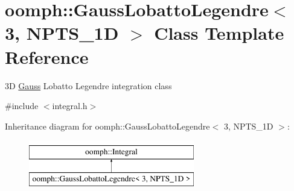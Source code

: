 \hypertarget{classoomph_1_1GaussLobattoLegendre_3_013_00_01NPTS__1D_01_4}{}\section{oomph\+:\+:Gauss\+Lobatto\+Legendre$<$ 3, N\+P\+T\+S\+\_\+1D $>$ Class Template Reference}
\label{classoomph_1_1GaussLobattoLegendre_3_013_00_01NPTS__1D_01_4}


3D \hyperlink{classoomph_1_1Gauss}{Gauss} Lobatto Legendre integration class  




{\ttfamily \#include $<$integral.\+h$>$}

Inheritance diagram for oomph\+:\+:Gauss\+Lobatto\+Legendre$<$ 3, N\+P\+T\+S\+\_\+1D $>$\+:\begin{figure}[H]
\begin{center}
\leavevmode
\includegraphics[height=2.000000cm]{classoomph_1_1GaussLobattoLegendre_3_013_00_01NPTS__1D_01_4}
\end{center}
\end{figure}
